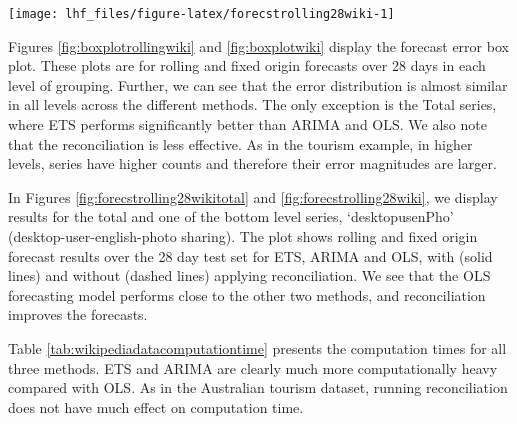 \documentclass[11pt,a4paper,]{article}
\let\origfigure\figure
\let\endorigfigure\endfigure
\renewenvironment{figure}[1][2] {
    \expandafter\origfigure\expandafter[!htbp]
} {
    \endorigfigure
}
\begin{document}
\begin{figure}

{\centering \texttt{[image: lhf\_files/figure-latex/forecstrolling28wiki-1]} 

}

\caption{The actual test set for the 'desktopusenPho21' bottom level series compared to the forecasts from reconciled and unreconciled ETS, ARIMA and OLS methods for rolling and fixed origin forecasts of Wikipedia pageviews.}\label{fig:forecstrolling28wiki}
\end{figure}

Figures \ref{fig:boxplotrollingwiki} and \ref{fig:boxplotwiki} display
the forecast error box plot. These plots are for rolling and fixed
origin forecasts over 28 days in each level of grouping. Further, we can
see that the error distribution is almost similar in all levels across
the different methods. The only exception is the Total series, where ETS
performs significantly better than ARIMA and OLS. We also note that the
reconciliation is less effective. As in the tourism example, in higher
levels, series have higher counts and therefore their error magnitudes
are larger.

In Figures \ref{fig:forecstrolling28wikitotal} and
\ref{fig:forecstrolling28wiki}, we display results for the total and one
of the bottom level series, `desktopusenPho' (desktop-user-english-photo
sharing). The plot shows rolling and fixed origin forecast results over
the 28 day test set for ETS, ARIMA and OLS, with (solid lines) and
without (dashed lines) applying reconciliation. We see that the OLS
forecasting model performs close to the other two methods, and
reconciliation improves the forecasts.

Table \ref{tab:wikipediadatacomputationtime} presents the computation
times for all three methods. ETS and ARIMA are clearly much more
computationally heavy compared with OLS. As in the Australian tourism
dataset, running reconciliation does not have much effect on computation
time.
\end{document}
